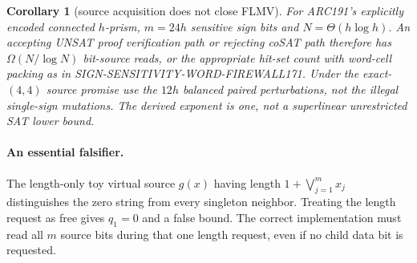 \documentclass[11pt]{article}
\newtheorem{corollary}[theorem]{Corollary}
\begin{document}
\begin{corollary}[source acquisition does not close FLMV]
For ARC191's explicitly encoded connected $h$-prism, $m=24h$ sensitive sign bits and $N=\Theta(h\log h)$. An accepting UNSAT proof verification path or rejecting coSAT path therefore has $\Omega(N/\log N)$ bit-source reads, or the appropriate hit-set count with word-cell packing as in SIGN-SENSITIVITY-WORD-FIREWALL171. Under the exact-$(4,4)$ source promise use the $12h$ balanced paired perturbations, not the illegal single-sign mutations. The derived exponent is one, not a superlinear unrestricted SAT lower bound.
\end{corollary}
\paragraph{An essential falsifier.}
The length-only toy virtual source $g(x)$ having length $1+\bigvee_{j=1}^m x_j$ distinguishes the zero string from every singleton neighbor. Treating the length request as free gives $q_1=0$ and a false bound. The correct implementation must read all $m$ source bits during that one length request, even if no child data bit is requested.
\end{document}

